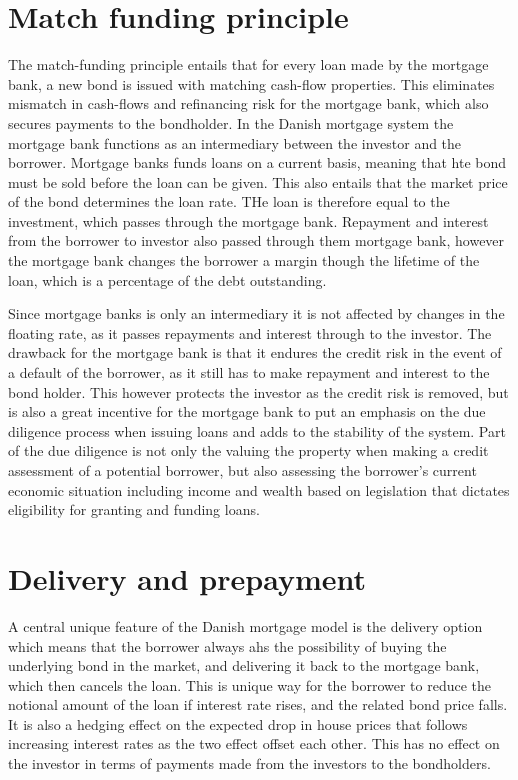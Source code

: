 \documentclass[12pt,twoside]{reedthesis}
\begin{document}
\hypertarget{match-funding-principle}{%
\section{Match funding principle}\label{match-funding-principle}}

The match-funding principle entails that for every loan made by the mortgage bank, a new bond is issued with matching cash-flow properties. This eliminates mismatch in cash-flows and refinancing risk for the mortgage bank, which also secures payments to the bondholder. In the Danish mortgage system the mortgage bank functions as an intermediary between the investor and the borrower. Mortgage banks funds loans on a current basis, meaning that hte bond must be sold before the loan can be given. This also entails that the market price of the bond determines the loan rate. THe loan is therefore equal to the investment, which passes through the mortgage bank. Repayment and interest from the borrower to investor also passed through them mortgage bank, however the mortgage bank changes the borrower a margin though the lifetime of the loan, which is a percentage of the debt outstanding.

Since mortgage banks is only an intermediary it is not affected by changes in the floating rate, as it passes repayments and interest through to the investor. The drawback for the mortgage bank is that it endures the credit risk in the event of a default of the borrower, as it still has to make repayment and interest to the bond holder. This however protects the investor as the credit risk is removed, but is also a great incentive for the mortgage bank to put an emphasis on the due diligence process when issuing loans and adds to the stability of the system. Part of the due diligence is not only the valuing the property when making a credit assessment of a potential borrower, but also assessing the borrower's current economic situation including income and wealth based on legislation that dictates eligibility for granting and funding loans.

\hypertarget{delivery-and-prepayment}{%
\section{Delivery and prepayment}\label{delivery-and-prepayment}}

A central unique feature of the Danish mortgage model is the delivery option which means that the borrower always ahs the possibility of buying the underlying bond in the market, and delivering it back to the mortgage bank, which then cancels the loan. This is unique way for the borrower to reduce the notional amount of the loan if interest rate rises, and the related bond price falls. It is also a hedging effect on the expected drop in house prices that follows increasing interest rates as the two effect offset each other. This has no effect on the investor in terms of payments made from the investors to the bondholders.
\end{document}
